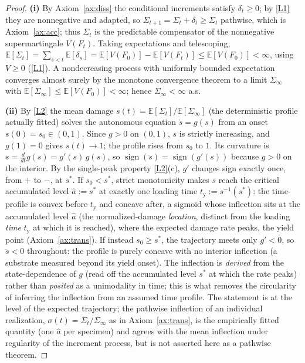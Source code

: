 \documentclass[11pt]{article}
\theoremstyle{plain}
\theoremstyle{definition}
\theoremstyle{remark}
\newcommand{\E}{\mathbb{E}}
\begin{document}
\begin{proof}
\textbf{(i)} By Axiom~\ref{ax:diss} the conditional increments satisfy $\delta_t\ge0$; by \ref{L1} they are nonnegative and adapted, so $\Sigma_{t+1}=\Sigma_t+\delta_t\ge\Sigma_t$ pathwise, which is Axiom~\ref{ax:acc}; thus $\Sigma_t$ is the predictable compensator of the nonnegative supermartingale $V(F_t)$. Taking expectations and telescoping, $\E[\Sigma_t]=\sum_{s<t}\E[\delta_s]=\E[V(F_0)]-\E[V(F_t)]\le \E[V(F_0)]<\infty$, using $V\ge0$ (\ref{L1}). A nondecreasing process with uniformly bounded expectation converges almost surely by the monotone convergence theorem to a limit $\Sigma_\infty$ with $\E[\Sigma_\infty]\le \E[V(F_0)]<\infty$; hence $\Sigma_\infty<\infty$ a.s.

\textbf{(ii)} By \ref{L2} the mean damage $s(t)=\E[\Sigma_t]/\E[\Sigma_\infty]$ (the deterministic profile actually fitted) solves the autonomous equation $\dot s=g(s)$ from an onset $s(0)=s_0\in(0,1)$. Since $g>0$ on $(0,1)$, $s$ is strictly increasing, and $g(1)=0$ gives $s(t)\to1$; the profile rises from $s_0$ to $1$. Its curvature is $\ddot s=\tfrac{d}{dt}g(s)=g'(s)\,g(s)$, so $\operatorname{sign}(\ddot s)=\operatorname{sign}(g'(s))$ because $g>0$ on the interior. By the single-peak property \ref{L2}(c), $g'$ changes sign exactly once, from $+$ to $-$, at $s^\ast$. If $s_0<s^\ast$, strict monotonicity makes $s$ reach the critical accumulated level $\hat a:=s^\ast$ at exactly one loading time $t_{\mathrm y}:=s^{-1}(s^\ast)$: the time-profile is convex before $t_{\mathrm y}$ and concave after, a sigmoid whose inflection sits at the accumulated level $\hat a$ (the normalized-damage \emph{location}, distinct from the loading \emph{time} $t_{\mathrm y}$ at which it is reached), where the expected damage rate peaks, the yield point (Axiom~\ref{ax:trans}). If instead $s_0\ge s^\ast$, the trajectory meets only $g'<0$, so $\ddot s<0$ throughout: the profile is purely concave with no interior inflection (a substrate measured beyond its yield onset). The inflection is \emph{derived} from the state-dependence of $g$ (read off the accumulated level $s^\ast$ at which the rate peaks) rather than \emph{posited} as a unimodality in time; this is what removes the circularity of inferring the inflection from an assumed time profile. The statement is at the level of the expected trajectory; the pathwise inflection of an individual realization, $\sigma(t)=\Sigma_t/\Sigma_\infty$ as in Axiom~\ref{ax:trans}, is the empirically fitted quantity (one $\hat a$ per specimen) and agrees with the mean inflection under regularity of the increment process, but is not asserted here as a pathwise theorem.


\end{proof}
\end{document}
